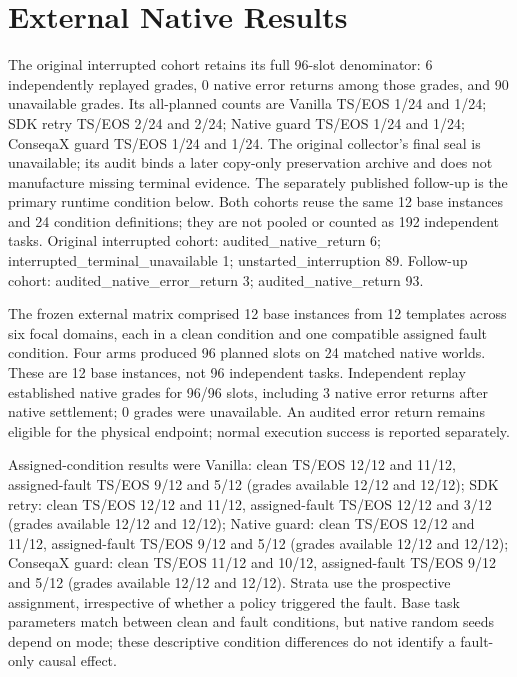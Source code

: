 \section{External Native Results}\label{sec:limbo-results}

The original interrupted cohort retains its full 96-slot denominator: 6 independently replayed grades, 0 native error returns among those grades, and 90 unavailable grades. Its all-planned counts are Vanilla TS/EOS 1/24 and 1/24; SDK retry TS/EOS 2/24 and 2/24; Native guard TS/EOS 1/24 and 1/24; ConseqaX guard TS/EOS 1/24 and 1/24. The original collector's final seal is unavailable; its audit binds a later copy-only preservation archive and does not manufacture missing terminal evidence. The separately published follow-up is the primary runtime condition below. Both cohorts reuse the same 12 base instances and 24 condition definitions; they are not pooled or counted as 192 independent tasks. Original interrupted cohort: audited\_native\_return 6; interrupted\_terminal\_unavailable 1; unstarted\_interruption 89. Follow-up cohort: audited\_native\_error\_return 3; audited\_native\_return 93.



The frozen external matrix comprised 12 base instances from 12 templates across six focal domains, each in a clean condition and one compatible assigned fault condition. Four arms produced 96 planned slots on 24 matched native worlds. These are 12 base instances, not 96 independent tasks. Independent replay established native grades for 96/96 slots, including 3 native error returns after native settlement; 0 grades were unavailable. An audited error return remains eligible for the physical endpoint; normal execution success is reported separately.

Assigned-condition results were Vanilla: clean TS/EOS 12/12 and 11/12, assigned-fault TS/EOS 9/12 and 5/12 (grades available 12/12 and 12/12); SDK retry: clean TS/EOS 12/12 and 11/12, assigned-fault TS/EOS 12/12 and 3/12 (grades available 12/12 and 12/12); Native guard: clean TS/EOS 12/12 and 11/12, assigned-fault TS/EOS 9/12 and 5/12 (grades available 12/12 and 12/12); ConseqaX guard: clean TS/EOS 11/12 and 10/12, assigned-fault TS/EOS 9/12 and 5/12 (grades available 12/12 and 12/12). Strata use the prospective assignment, irrespective of whether a policy triggered the fault. Base task parameters match between clean and fault conditions, but native random seeds depend on mode; these descriptive condition differences do not identify a fault-only causal effect.

